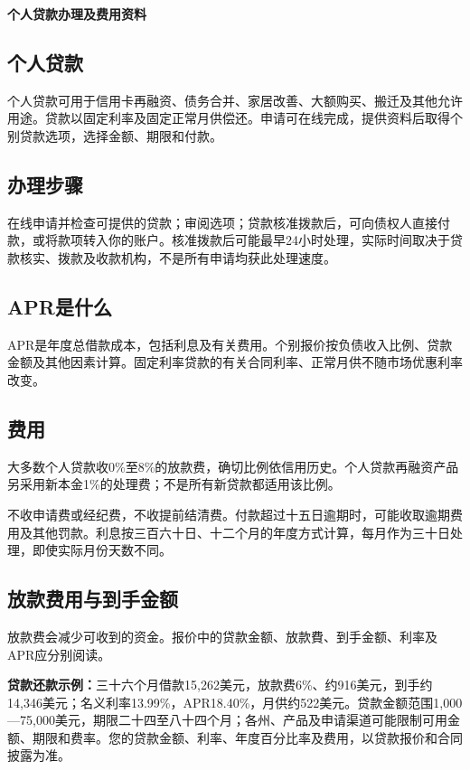 \documentclass[UTF8,fontset=none,11pt,a4paper]{ctexart}
\begin{document}
{\noindent\fontsize{20}{25}\selectfont\bfseries 个人贷款办理及费用资料\par}
\vspace{10pt}
\subsection*{个人贷款}
个人贷款可用于信用卡再融资、债务合并、家居改善、大额购买、搬迁及其他允许用途。贷款以固定利率及固定正常月供偿还。申请可在线完成，提供资料后取得个别贷款选项，选择金额、期限和付款。


\subsection*{办理步骤}
在线申请并检查可提供的贷款；审阅选项；贷款核准拨款后，可向债权人直接付款，或将款项转入你的账户。核准拨款后可能最早24小时处理，实际时间取决于贷款核实、拨款及收款机构，不是所有申请均获此处理速度。


\subsection*{APR是什么}
APR是年度总借款成本，包括利息及有关费用。个别报价按负债收入比例、贷款金额及其他因素计算。固定利率贷款的有关合同利率、正常月供不随市场优惠利率改变。


\subsection*{费用}
大多数个人贷款收0\%至8\%的放款费，确切比例依信用历史。个人贷款再融资产品另采用新本金1\%的处理费；不是所有新贷款都适用该比例。


不收申请费或经纪费，不收提前结清费。付款超过十五日逾期时，可能收取逾期费用及其他罚款。利息按三百六十日、十二个月的年度方式计算，每月作为三十日处理，即使实际月份天数不同。


\subsection*{放款费用与到手金额}
放款费会减少可收到的资金。报价中的贷款金额、放款費、到手金额、利率及APR应分别阅读。


\textbf{贷款还款示例：}三十六个月借款15,262美元，放款费6\%、约916美元，到手约14,346美元；名义利率13.99\%，APR18.40\%，月供约522美元。贷款金额范围1,000—75,000美元，期限二十四至八十四个月；各州、产品及申请渠道可能限制可用金额、期限和费率。您的贷款金额、利率、年度百分比率及费用，以贷款报价和合同披露为准。
\end{document}
